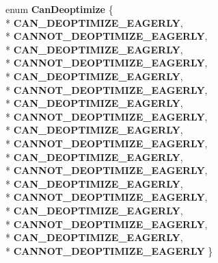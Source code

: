\begin{DoxyCompactItemize}
\item 
enum {\bfseries Can\+Deoptimize} \{ \\*
{\bfseries C\+A\+N\+\_\+\+D\+E\+O\+P\+T\+I\+M\+I\+Z\+E\+\_\+\+E\+A\+G\+E\+R\+LY}, 
\\*
{\bfseries C\+A\+N\+N\+O\+T\+\_\+\+D\+E\+O\+P\+T\+I\+M\+I\+Z\+E\+\_\+\+E\+A\+G\+E\+R\+LY}, 
\\*
{\bfseries C\+A\+N\+\_\+\+D\+E\+O\+P\+T\+I\+M\+I\+Z\+E\+\_\+\+E\+A\+G\+E\+R\+LY}, 
\\*
{\bfseries C\+A\+N\+N\+O\+T\+\_\+\+D\+E\+O\+P\+T\+I\+M\+I\+Z\+E\+\_\+\+E\+A\+G\+E\+R\+LY}, 
\\*
{\bfseries C\+A\+N\+\_\+\+D\+E\+O\+P\+T\+I\+M\+I\+Z\+E\+\_\+\+E\+A\+G\+E\+R\+LY}, 
\\*
{\bfseries C\+A\+N\+N\+O\+T\+\_\+\+D\+E\+O\+P\+T\+I\+M\+I\+Z\+E\+\_\+\+E\+A\+G\+E\+R\+LY}, 
\\*
{\bfseries C\+A\+N\+\_\+\+D\+E\+O\+P\+T\+I\+M\+I\+Z\+E\+\_\+\+E\+A\+G\+E\+R\+LY}, 
\\*
{\bfseries C\+A\+N\+N\+O\+T\+\_\+\+D\+E\+O\+P\+T\+I\+M\+I\+Z\+E\+\_\+\+E\+A\+G\+E\+R\+LY}, 
\\*
{\bfseries C\+A\+N\+\_\+\+D\+E\+O\+P\+T\+I\+M\+I\+Z\+E\+\_\+\+E\+A\+G\+E\+R\+LY}, 
\\*
{\bfseries C\+A\+N\+N\+O\+T\+\_\+\+D\+E\+O\+P\+T\+I\+M\+I\+Z\+E\+\_\+\+E\+A\+G\+E\+R\+LY}, 
\\*
{\bfseries C\+A\+N\+\_\+\+D\+E\+O\+P\+T\+I\+M\+I\+Z\+E\+\_\+\+E\+A\+G\+E\+R\+LY}, 
\\*
{\bfseries C\+A\+N\+N\+O\+T\+\_\+\+D\+E\+O\+P\+T\+I\+M\+I\+Z\+E\+\_\+\+E\+A\+G\+E\+R\+LY}, 
\\*
{\bfseries C\+A\+N\+\_\+\+D\+E\+O\+P\+T\+I\+M\+I\+Z\+E\+\_\+\+E\+A\+G\+E\+R\+LY}, 
\\*
{\bfseries C\+A\+N\+N\+O\+T\+\_\+\+D\+E\+O\+P\+T\+I\+M\+I\+Z\+E\+\_\+\+E\+A\+G\+E\+R\+LY}, 
\\*
{\bfseries C\+A\+N\+\_\+\+D\+E\+O\+P\+T\+I\+M\+I\+Z\+E\+\_\+\+E\+A\+G\+E\+R\+LY}, 
\\*
{\bfseries C\+A\+N\+N\+O\+T\+\_\+\+D\+E\+O\+P\+T\+I\+M\+I\+Z\+E\+\_\+\+E\+A\+G\+E\+R\+LY}, 
\\*
{\bfseries C\+A\+N\+\_\+\+D\+E\+O\+P\+T\+I\+M\+I\+Z\+E\+\_\+\+E\+A\+G\+E\+R\+LY}, 
\\*
{\bfseries C\+A\+N\+N\+O\+T\+\_\+\+D\+E\+O\+P\+T\+I\+M\+I\+Z\+E\+\_\+\+E\+A\+G\+E\+R\+LY}
 \}\hypertarget{classv8_1_1internal_1_1_l_chunk_builder_a9cad53584f2d1fbb8c273561a6e3f2e9}{}\label{classv8_1_1internal_1_1_l_chunk_builder_a9cad53584f2d1fbb8c273561a6e3f2e9}

\end{DoxyCompactItemize}
